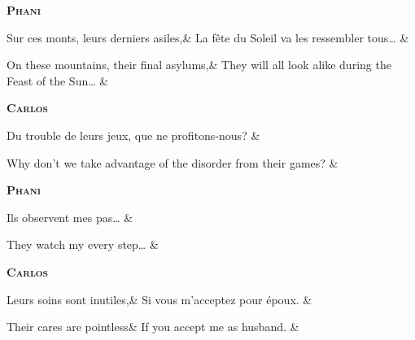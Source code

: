 \documentclass{article}
\newcommand{\dialogue}[1]{%
    \filbreak\begin{center}
	    \textbf{\textsc{#1}}
    \end{center}\nopagebreak}
\begin{document}
\dialogue{Phani}
\begin{pairs}
\begin{Leftside}
	\stanza
		Sur ces monts, leurs derniers asiles,&
		La f\^{e}te du Soleil va les ressembler tous\ldots{}
    \& 
    \endnumbering
\end{Leftside}
\begin{Rightside}
	\stanza
		On these mountains, their final asylums,&
		They will all look alike during the Feast of the Sun\ldots{}
    \& 
    \endnumbering
\end{Rightside} 
\Columns 
\end{pairs}
 
\dialogue{Carlos}
\begin{pairs}
\begin{Leftside}
	\stanza
		Du trouble de leurs jeux, que ne profitons-nous?
    \& 
    \endnumbering
\end{Leftside}
\begin{Rightside}
	\stanza
		Why don't we take advantage of the disorder from their games?
    \& 
    \endnumbering
\end{Rightside} 
\Columns 
\end{pairs}

\dialogue{Phani}
\begin{pairs}
\begin{Leftside}
	\stanza
		Ils observent mes pas\ldots{}
    \& 
    \endnumbering
\end{Leftside}
\begin{Rightside}
	\stanza
		They watch my every step\ldots{}
    \& 
    \endnumbering
\end{Rightside} 
\Columns 
\end{pairs}

\dialogue{Carlos}
\begin{pairs}
\begin{Leftside}
	\stanza
		Leurs soins sont inutiles,&
		Si vous m'acceptez pour \'{e}poux.
    \& 
    \endnumbering
\end{Leftside}
\begin{Rightside}
	\stanza
		Their cares are pointless&
		If you accept me as husband.
    \& 
    \endnumbering
\end{Rightside} 
\Columns 
\end{pairs}
\end{document}

